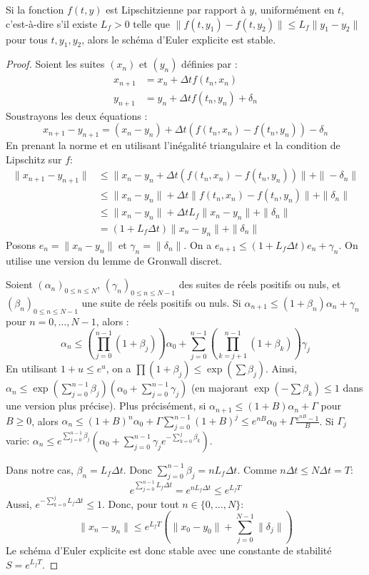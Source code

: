 \begin{proposition}
Si la fonction $f(t,y)$ est Lipschitzienne par rapport à $y$, uniformément en $t$, c'est-à-dire s'il existe $L_f > 0$ telle que $\|f(t,y_1) - f(t,y_2)\| \le L_f \|y_1 - y_2\|$ pour tous $t, y_1, y_2$, alors le schéma d'Euler explicite est stable.
\end{proposition}
\begin{proof}
Soient les suites $(x_n)$ et $(y_n)$ définies par :
\begin{align*}
x_{n+1} &= x_n + \Delta t f(t_n, x_n) \\
y_{n+1} &= y_n + \Delta t f(t_n, y_n) + \delta_n
\end{align*}
Soustrayons les deux équations :
\[
x_{n+1} - y_{n+1} = (x_n - y_n) + \Delta t (f(t_n, x_n) - f(t_n, y_n)) - \delta_n
\]
En prenant la norme et en utilisant l'inégalité triangulaire et la condition de Lipschitz sur $f$:
\begin{align*}
\|x_{n+1} - y_{n+1}\| &\le \|x_n - y_n + \Delta t (f(t_n, x_n) - f(t_n, y_n))\| + \|-\delta_n\| \\
&\le \|x_n - y_n\| + \Delta t \|f(t_n, x_n) - f(t_n, y_n)\| + \|\delta_n\| \\
&\le \|x_n - y_n\| + \Delta t L_f \|x_n - y_n\| + \|\delta_n\| \\
&= (1 + L_f \Delta t) \|x_n - y_n\| + \|\delta_n\|
\end{align*}
Posons $e_n = \|x_n - y_n\|$ et $\gamma_n = \|\delta_n\|$. On a $e_{n+1} \le (1 + L_f \Delta t) e_n + \gamma_n$.
On utilise une version du lemme de Gronwall discret.
\begin{lemma}
Soient $(\alpha_n)_{0 \le n \le N}$, $(\gamma_n)_{0 \le n \le N-1}$ des suites de réels positifs ou nuls, et $(\beta_n)_{0 \le n \le N-1}$ une suite de réels positifs ou nuls. Si $\alpha_{n+1} \le (1+\beta_n)\alpha_n + \gamma_n$ pour $n=0, \dots, N-1$, alors :
\[
\alpha_n \le \left( \prod_{j=0}^{n-1} (1+\beta_j) \right) \alpha_0 + \sum_{j=0}^{n-1} \left( \prod_{k=j+1}^{n-1} (1+\beta_k) \right) \gamma_j
\]
En utilisant $1+u \le e^u$, on a $\prod (1+\beta_j) \le \exp(\sum \beta_j)$.
Ainsi, $\alpha_n \le \exp\left(\sum_{j=0}^{n-1} \beta_j\right) \left( \alpha_0 + \sum_{j=0}^{n-1} \gamma_j \right)$ (en majorant $\exp(-\sum \beta_k) \le 1$ dans une version plus précise).
Plus précisément, si $\alpha_{n+1} \le (1+B)\alpha_n + \Gamma$ pour $B \ge 0$, alors $\alpha_n \le (1+B)^n \alpha_0 + \Gamma \sum_{j=0}^{n-1} (1+B)^j \le e^{nB} \alpha_0 + \Gamma \frac{e^{nB}-1}{B}$. Si $\Gamma_j$ varie:
$\alpha_n \le e^{\sum_{j=0}^{n-1}\beta_j} \left( \alpha_0 + \sum_{j=0}^{n-1} \gamma_j e^{-\sum_{k=0}^{j}\beta_k} \right)$.
\end{lemma}
Dans notre cas, $\beta_n = L_f \Delta t$. Donc $\sum_{j=0}^{n-1} \beta_j = n L_f \Delta t$. Comme $n \Delta t \le N \Delta t = T$:
\[
e^{\sum_{j=0}^{n-1} L_f \Delta t} = e^{n L_f \Delta t} \le e^{L_f T}
\]
Aussi, $e^{-\sum_{k=0}^{j} L_f \Delta t} \le 1$.
Donc, pour tout $n \in \{0, \dots, N\}$:
\[
\|x_n - y_n\| \le e^{L_f T} \left( \|x_0 - y_0\| + \sum_{j=0}^{N-1} \|\delta_j\| \right)
\]
Le schéma d'Euler explicite est donc stable avec une constante de stabilité $S = e^{L_f T}$.
\end{proof}

